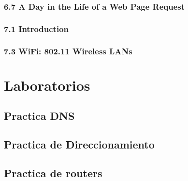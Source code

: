 \documentclass[12pt, twoside, openright]{report} %
\begin{document}
\section{6.7 A Day in the Life of a Web Page Request}

\section{7.1 Introduction}

\section{7.3 WiFi: 802.11 Wireless LANs}








\part{Laboratorios}
\chapter{Practica DNS}


\chapter{Practica de Direccionamiento}


\chapter{Practica de routers}


\end{document}
